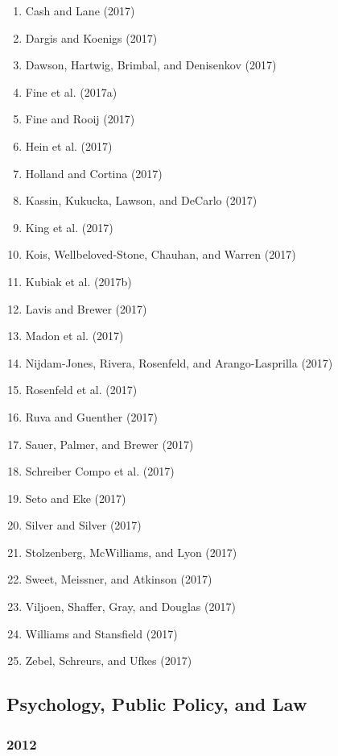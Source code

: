 \documentclass[english,man]{apa6}
\providecommand{\tightlist}{%
  \setlength{\itemsep}{0pt}\setlength{\parskip}{0pt}}
\theoremstyle{definition}
\theoremstyle{definition}
\theoremstyle{definition}
\theoremstyle{remark}
\begin{document}
\begin{enumerate}
\def\labelenumi{\arabic{enumi})}
\tightlist
\item
  Cash and Lane (2017)
\item
  Dargis and Koenigs (2017)
\item
  Dawson, Hartwig, Brimbal, and Denisenkov (2017)
\item
  Fine et al. (2017a)
\item
  Fine and Rooij (2017)
\item
  Hein et al. (2017)
\item
  Holland and Cortina (2017)
\item
  Kassin, Kukucka, Lawson, and DeCarlo (2017)
\item
  King et al. (2017)
\item
  Kois, Wellbeloved-Stone, Chauhan, and Warren (2017)
\item
  Kubiak et al. (2017b)
\item
  Lavis and Brewer (2017)
\item
  Madon et al. (2017)
\item
  Nijdam-Jones, Rivera, Rosenfeld, and Arango-Lasprilla (2017)
\item
  Rosenfeld et al. (2017)
\item
  Ruva and Guenther (2017)
\item
  Sauer, Palmer, and Brewer (2017)
\item
  Schreiber Compo et al. (2017)
\item
  Seto and Eke (2017)
\item
  Silver and Silver (2017)
\item
  Stolzenberg, McWilliams, and Lyon (2017)
\item
  Sweet, Meissner, and Atkinson (2017)
\item
  Viljoen, Shaffer, Gray, and Douglas (2017)
\item
  Williams and Stansfield (2017)
\item
  Zebel, Schreurs, and Ufkes (2017)
\end{enumerate}

\subsection{Psychology, Public Policy, and
Law}\label{psychology-public-policy-and-law}

\subsubsection{2012}\label{section-26}
\end{document}
